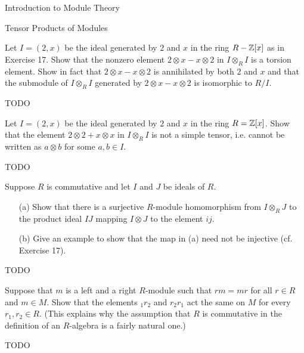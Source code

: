 \begin{chapter}{Introduction to Module Theory}
\begin{section}{Tensor Products of Modules}
\begin{solution}
\end{solution}\oneperpage



\begin{problem}\label{ex:10.4.19}
Let $I=(2,x)$ be the ideal generated by $2$ and $x$ in the ring $R-\mathbb{Z}[x]$ as in Exercise 17. Show that the nonzero element $2\otimes x-x\otimes 2$ in $I\otimes_R I$ is a torsion element. Show in fact that $2\otimes x - x\otimes 2$ is annihilated by both $2$ and $x$ and that the submodule of $I\otimes_R I$ generated by $2\otimes x - x\otimes 2$ is isomorphic to $R/I$. 
\end{problem}
\begin{solution}TODO

\end{solution}\oneperpage



\begin{problem}\label{ex:10.4.20}
Let $I=(2,x)$ be the ideal generated by $2$ and $x$ in the ring $R=\mathbb{Z}[x]$. Show that the element $2\otimes 2 + x\otimes x$ in $I\otimes_RI$ is not a simple tensor, i.e. cannot be written as $a\otimes b$ for some $a,b\in I$. 
\end{problem}
\begin{solution}TODO

\end{solution}\oneperpage



\begin{problem}\label{ex:10.4.21}
Suppose $R$ is commutative and let $I$ and $J$ be ideals of $R$. 
\begin{enumerate}
\item[(a)] Show that there is a surjective $R$-module homomorphism from $I\otimes_R J$ to the product ideal $IJ$ mapping $I\otimes J$ to the element $ij$.
\item[(b)] Give an example to show that the map in (a) need not be injective (cf. Exercise 17). 
\end{enumerate}
\end{problem}
\begin{solution}TODO

\end{solution}\oneperpage



\begin{problem}\label{ex:10.4.22}
Suppose that $m$ is a left and a right $R$-module such that $rm=mr$ for all $r\in R$ and $m\in M$. Show that the elements $_1r_2$ and $r_2r_1$ act the same on $M$ for every $r_1,r_2\in R$. (This explains why the assumption that $R$ is commutative in the definition of an $R$-algebra is a fairly natural one.) 
\end{problem}
\begin{solution}TODO


\end{solution}
\end{section}
\end{chapter}
